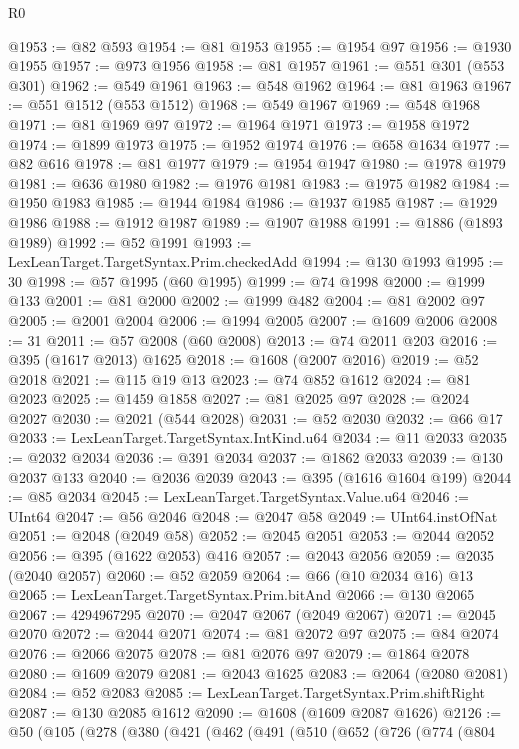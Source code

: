 \begin{lexlean}{R0}
\begin{coremodule}
@1953 := @82 @593
@1954 := @81 @1953
@1955 := @1954 @97
@1956 := @1930 @1955
@1957 := @973 @1956
@1958 := @81 @1957
@1961 := @551 @301 (@553 @301)
@1962 := @549 @1961
@1963 := @548 @1962
@1964 := @81 @1963
@1967 := @551 @1512 (@553 @1512)
@1968 := @549 @1967
@1969 := @548 @1968
@1971 := @81 @1969 @97
@1972 := @1964 @1971
@1973 := @1958 @1972
@1974 := @1899 @1973
@1975 := @1952 @1974
@1976 := @658 @1634
@1977 := @82 @616
@1978 := @81 @1977
@1979 := @1954 @1947
@1980 := @1978 @1979
@1981 := @636 @1980
@1982 := @1976 @1981
@1983 := @1975 @1982
@1984 := @1950 @1983
@1985 := @1944 @1984
@1986 := @1937 @1985
@1987 := @1929 @1986
@1988 := @1912 @1987
@1989 := @1907 @1988
@1991 := @1886 (@1893 @1989)
@1992 := @52 @1991
@1993 := LexLeanTarget.TargetSyntax.Prim.checkedAdd
@1994 := @130 @1993
@1995 := 30
@1998 := @57 @1995 (@60 @1995)
@1999 := @74 @1998
@2000 := @1999 @133
@2001 := @81 @2000
@2002 := @1999 @482
@2004 := @81 @2002 @97
@2005 := @2001 @2004
@2006 := @1994 @2005
@2007 := @1609 @2006
@2008 := 31
@2011 := @57 @2008 (@60 @2008)
@2013 := @74 @2011 @203
@2016 := @395 (@1617 @2013) @1625
@2018 := @1608 (@2007 @2016)
@2019 := @52 @2018
@2021 := @115 @19 @13
@2023 := @74 @852 @1612
@2024 := @81 @2023
@2025 := @1459 @1858
@2027 := @81 @2025 @97
@2028 := @2024 @2027
@2030 := @2021 (@544 @2028)
@2031 := @52 @2030
@2032 := @66 @17
@2033 := LexLeanTarget.TargetSyntax.IntKind.u64
@2034 := @11 @2033
@2035 := @2032 @2034
@2036 := @391 @2034
@2037 := @1862 @2033
@2039 := @130 @2037 @133
@2040 := @2036 @2039
@2043 := @395 (@1616 @1604 @199)
@2044 := @85 @2034
@2045 := LexLeanTarget.TargetSyntax.Value.u64
@2046 := UInt64
@2047 := @56 @2046
@2048 := @2047 @58
@2049 := UInt64.instOfNat
@2051 := @2048 (@2049 @58)
@2052 := @2045 @2051
@2053 := @2044 @2052
@2056 := @395 (@1622 @2053) @416
@2057 := @2043 @2056
@2059 := @2035 (@2040 @2057)
@2060 := @52 @2059
@2064 := @66 (@10 @2034 @16) @13
@2065 := LexLeanTarget.TargetSyntax.Prim.bitAnd
@2066 := @130 @2065
@2067 := 4294967295
@2070 := @2047 @2067 (@2049 @2067)
@2071 := @2045 @2070
@2072 := @2044 @2071
@2074 := @81 @2072 @97
@2075 := @84 @2074
@2076 := @2066 @2075
@2078 := @81 @2076 @97
@2079 := @1864 @2078
@2080 := @1609 @2079
@2081 := @2043 @1625
@2083 := @2064 (@2080 @2081)
@2084 := @52 @2083
@2085 := LexLeanTarget.TargetSyntax.Prim.shiftRight
@2087 := @130 @2085 @1612
@2090 := @1608 (@1609 @2087 @1626)
@2126 := @50
    (@105
      (@278
        (@380
          (@421
            (@462
              (@491
                (@510
                  (@652
                    (@726
                      (@774
                        (@804

\end{coremodule}
\end{lexlean}
